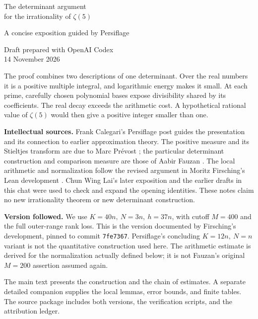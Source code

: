 \documentclass[11pt]{article}
\theoremstyle{definition}
\numberwithin{equation}{section}
\begin{document}
\hypersetup{pageanchor=false}
\begin{titlepage}
\vspace*{15mm}
{\LARGE The determinant argument\\[4pt]
for the irrationality of \(\zeta(5)\)\par}
\vspace{8mm}
{\large A concise exposition guided by Persiflage\par}
\vspace{4mm}
Draft prepared with OpenAI Codex\\
14 November 2026
\vspace{9mm}

The proof combines two descriptions of one determinant. Over the real
numbers it is a positive multiple integral, and logarithmic energy makes
it small. At each prime, carefully chosen polynomial bases expose
divisibility shared by its coefficients. The real decay exceeds the
arithmetic cost. A hypothetical rational value of \(\zeta(5)\) would then
give a positive integer smaller than one.

\vspace{4mm}
\textbf{Intellectual sources.}
Frank Calegari's Persiflage post \cite{persiflage} guides the presentation
and its connection to earlier approximation theory. The positive measure
and its Stieltjes transform are due to Marc Pr\'evost
\cite{prevost}; the particular determinant construction and comparison
measure are those of Aabir Fauzan \cite{fauzan}. The local arithmetic and
normalization follow the revised argument in Moritz Firsching's Lean
development \cite{firsching}. Chun Wing Lai's later exposition
\cite{lai} and the earlier drafts in this chat were used to check and
expand the opening identities. These notes claim no new irrationality
theorem or new determinant construction.

\vspace{3mm}
\textbf{Version followed.}
We use \(K=40n,\ N=3n,\ h=37n\), with cutoff \(M=400\) and the full
outer-range rank loss. This is the version documented by Firsching's
development, pinned to commit \texttt{7fe7367}. Persiflage's concluding
\(K=12n,\ N=n\) variant is not the quantitative construction used here.
The arithmetic estimate is derived for the normalization actually defined
below; it is not Fauzan's original \(M=200\) assertion assumed again.

\vfill
The main text presents the construction and the chain of estimates.
A separate detailed companion supplies the local lemmas, error bounds,
and finite tables. The source package includes both versions, the
verification scripts, and the attribution ledger.
\end{titlepage}
\hypersetup{pageanchor=true}
\tableofcontents
\clearpage
{}







\appendix




\end{document}
